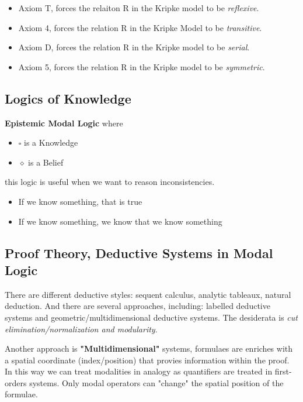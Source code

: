 \documentclass[a4paper]{article}
\begin{document}
\begin{itemize}
    \item Axiom T, forces the relaiton R in the Kripke model to be \textit{reflexive}.
    \item Axiom 4, forces the relation R in the Kripke Model to be \textit{transitive}.
    \item Axiom D, forces the relation R in the Kripke model to be \textit{serial}.
    \item Axiom 5, forces the relation R in the Kripke model to be \textit{symmetric}. 
\end{itemize}

\subsection{Logics of Knowledge}

\textbf{Epistemic Modal Logic} where
\begin{itemize}
    \item $\square$ is a Knowledge
    \item $\diamond$ is a Belief
\end{itemize}

this logic is useful when we want to reason inconsistencies.

\begin{itemize}
    \item If we know something, that is true
    \item If we know something, we know that we know something
\end{itemize}

\subsection{Proof Theory, Deductive Systems in Modal Logic}

There are different deductive styles: sequent calculus, analytic tableaux, natural deduction.
And there are several approaches, including: labelled deductive systems and geometric/multidimensional deductive systems.
The desiderata is \textit{cut elimination/normalization and modularity}.

\vspace{1em}
\noindent
Another approach is \textbf{"Multidimensional"} systems, formulaes are enriches with a spatial coordinate (index/position)
that provies information within the proof.
In this way we can treat modalities in analogy as quantifiers are treated in first-orders systems.
Only modal operators can "change" the spatial position of the formulae.
\end{document}
